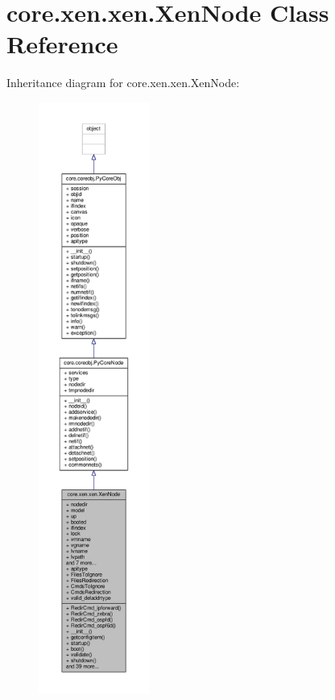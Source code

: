 \hypertarget{classcore_1_1xen_1_1xen_1_1_xen_node}{\section{core.\+xen.\+xen.\+Xen\+Node Class Reference}
\label{classcore_1_1xen_1_1xen_1_1_xen_node}
}


Inheritance diagram for core.\+xen.\+xen.\+Xen\+Node\+:
\nopagebreak
\begin{figure}[H]
\begin{center}
\leavevmode
\includegraphics[height=550pt]{classcore_1_1xen_1_1xen_1_1_xen_node__inherit__graph}
\end{center}
\end{figure}


